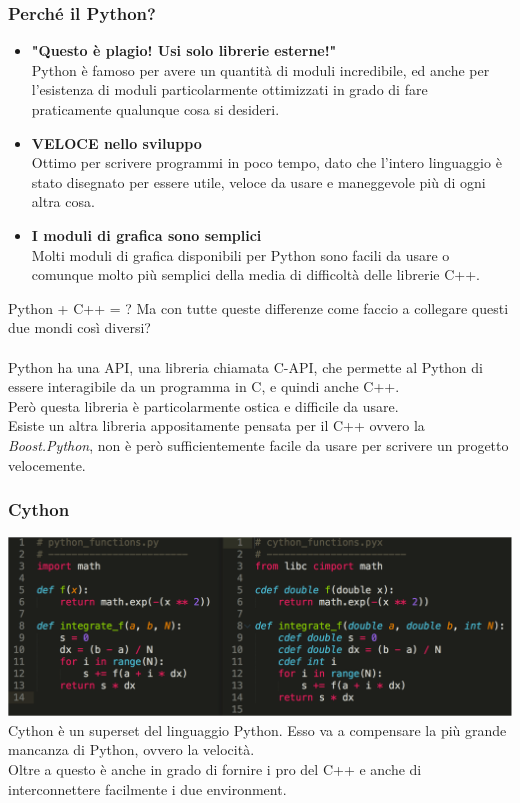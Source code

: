 \documentclass[11pt]{beamer}
\begin{document}
\begin{frame}
\frametitle{Perché il Python?}
\begin{itemize}
	\pause
	\item \textbf{"Questo è plagio! Usi solo librerie esterne!"}\\
	Python è famoso per avere un quantità di moduli incredibile\footnotemark, ed anche per l'esistenza di moduli particolarmente ottimizzati in grado di fare praticamente qualunque cosa si desideri.
	\pause
	\item \textbf{VELOCE nello sviluppo} \\
	Ottimo per scrivere programmi in poco tempo, dato che l'intero linguaggio è stato disegnato per essere utile, veloce da usare e maneggevole più di ogni altra cosa.
	\pause
	\item \textbf{I moduli di grafica sono semplici} \\
	Molti moduli di grafica disponibili per Python sono facili da usare o comunque molto più semplici della media di difficoltà delle librerie C++.
\end{itemize}
\end{frame}

\begin{frame}{Python + C++ = ?}
Ma con tutte queste differenze come faccio a collegare questi due mondi così diversi?\\\\
\pause
Python ha una API, una libreria chiamata C-API, che permette al Python di essere interagibile da un programma in C, e quindi anche C++.\\
Però questa libreria è particolarmente ostica e difficile da usare.\\
Esiste un altra libreria appositamente pensata per il C++ ovvero la \emph{Boost.Python}, non è però sufficientemente facile da usare per scrivere un progetto velocemente.
\end{frame}

\begin{frame}
\frametitle{Cython}
\includegraphics[width=\linewidth]{cython-code.png}
Cython è un superset del linguaggio Python. Esso va a compensare la più grande mancanza di Python, ovvero la velocità. \\
Oltre a questo è anche in grado di fornire i pro del C++ e anche di interconnettere facilmente i due environment.
\end{frame}
\end{document}
